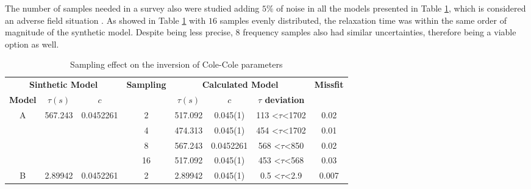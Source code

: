 \documentclass{vie16}
\begin{document}
The number of samples needed in a survey also were studied adding $5\%$
of noise in all the models presented in Table
\ref{t:INV-sample_effect}, which is considered an adverse field situation
\citet{sandor11}. As showed in Table \ref{t:INV-sample_effect} with
$16$ samples evenly distributed, the relaxation time was within the
same order of magnitude of the synthetic model. Despite being less
precise, $8$ frequency samples also had similar uncertainties, therefore
being a viable option as well.

\begin{table}[H]
\centering
\caption{Sampling effect on the inversion of Cole-Cole parameters}
\label{t:INV-sample_effect}
\begin{adjustbox}{scale=0.9}
\begin{tabular}{@{}|c|c|c|c|c|c|c|c|@{}}
\multicolumn{3}{|c|}{\textbf{Sinthetic Model}}                             & \multirow{2}{*}{\textbf{Sampling}} & \multicolumn{3}{c|}{\textbf{Calculated Model}}                          & \multirow{2}{*}{\textbf{Missfit}}    \\
\textbf{Model}     & \textbf{$\tau (s)$}          & \textbf{$c$}
&                                    & \textbf{$\tau (s)$} & \textbf{$c$} & \textbf{$\tau$ deviation}         &                                      \\ \hline
\multirow{4}{*}{A} & \multirow{4}{*}{567.243} & \multirow{4}{*}{0.0452261} & 2                                  & 517.092         & 0.045(1)          & 113 \textless$\tau$\textless 1702 & 0.02                                 \\
                   &                          &                            & 4                                  & 474.313         & 0.045(1)          & 454 \textless$\tau$\textless 1702 & 0.01                                 \\
                   &                          &                            & 8                                  & 567.243         & 0.0452261         & 568 \textless$\tau$\textless 850  & 0.02                                 \\
                   &                          &                            & 16                                 & 517.092         & 0.045(1)          & 453 \textless$\tau$\textless 568  & 0.03                                 \\ \hline
\multirow{4}{*}{B} & \multirow{4}{*}{2.89942} & \multirow{4}{*}{0.0452261} & 2                                  & 2.89942         & 0.045(1)          & 0.5 \textless$\tau$\textless 2.9  & 0.007                                \\

\end{tabular}
\end{adjustbox}
\end{table}
\end{document}
